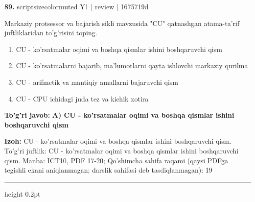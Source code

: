\documentclass[10pt,a4paper]{article}
\begin{document}
{\bfseries\sffamily\color{ink} 89.} {scriptsizecolor{muted} Y1 | review | 1675719d}
\par
Markaziy protsessor va bajarish sikli mavzusida "CU" qatnashgan atama-ta'rif juftliklaridan to'g'risini toping.
\begin{enumerate}[label=\Alph*),leftmargin=9mm]
\item CU - ko'rsatmalar oqimi va boshqa qismlar ishini boshqaruvchi qism
\item CU - ko'rsatmalarni bajarib, ma'lumotlarni qayta ishlovchi markaziy qurilma
\item CU - arifmetik va mantiqiy amallarni bajaruvchi qism
\item CU - CPU ichidagi juda tez va kichik xotira
\end{enumerate}
\begin{tcolorbox}[enhanced,breakable,colback=teal!4,colframe=teal!60!black,boxrule=0.45pt,arc=1.2mm,left=2.7mm,right=2.7mm,top=1.8mm,bottom=1.8mm,before skip=2mm,after skip=2mm]
{\bfseries\sffamily\color{teal}To'g'ri javob:} \textbf{A) CU - ko'rsatmalar oqimi va boshqa qismlar ishini boshqaruvchi qism}
\par\smallskip
{\bfseries Izoh:} CU - ko'rsatmalar oqimi va boshqa qismlar ishini boshqaruvchi qism. To'g'ri juftlik: CU - ko'rsatmalar oqimi va boshqa qismlar ishini boshqaruvchi qism. Manba: ICT10, PDF 17-20; Qo'shimcha sahifa raqami (qaysi PDFga tegishli ekani aniqlanmagan; darslik sahifasi deb tasdiqlanmagan): 19
\end{tcolorbox}
\vspace{2mm}\hrule height 0.2pt\vspace{3mm}
\end{document}
